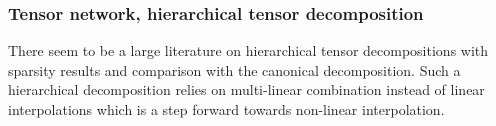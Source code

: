 \subsubsection{Tensor network, hierarchical tensor decomposition}

There seem to be a large literature on hierarchical tensor decompositions \parencite{bachmayr_tensor_2016} with sparsity results and comparison with the canonical decomposition. Such a hierarchical decomposition relies on multi-linear combination instead of linear interpolations which is a step forward towards non-linear interpolation.

